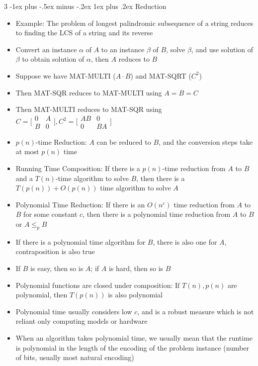 \documentclass[10pt, landscape]{article}
\makeatletter
\renewcommand{\subsection}{\@startsection{subsection}{3}{0mm}%
                                {-1ex plus -.5ex minus -.2ex}%
                                {1ex plus .2ex}%
                                {\normalfont\small\bfseries}}%
\makeatother
\begin{document}
\begin{multicols*}{3}
\subsection{Reduction}
\begin{itemize}
    \item Example: The problem of longest palindromic subsequence of a string reduces to finding the LCS of a string and its reverse
    \item Convert an instance $\alpha$ of $A$ to an instance $\beta$ of $B$, solve $\beta$, and use solution of $\beta$ to obtain solution of $\alpha$, then $A$ reduces to $B$
    \item Suppose we have MAT-MULTI ($A \cdot B$) and MAT-SQRT ($C^2$)
    \item Then MAT-SQR reduces to MAT-MULTI using $A=B=C$
    \item Then MAT-MULTI reduces to MAT-SQR using $C=\big[\begin{smallmatrix}0 & A\\B & 0\end{smallmatrix}\big], C^2=\big[\begin{smallmatrix}AB & 0\\0 & BA\end{smallmatrix}\big]$
    \item $p(n)$-time Reduction: $A$ can be reduced to $B$, and the conversion steps take at most $p(n)$ time
    \item Running Time Composition: If there is a $p(n)$-time reduction from $A$ to $B$ and a $T(n)$-time algorithm to solve $B$, then there is a $T(p(n))+O(p(n))$ time algorithm to solve $A$
    \item Polynomial Time Reduction: If there is an $O(n^c)$ time reduction from $A$ to $B$ for some constant $c$, then there is a polynomial time reduction from $A$ to $B$ or $A \leq_p B$
    \item If there is a polynomial time algorithm for $B$, there is also one for $A$, contraposition is also true
    \item If $B$ is easy, then so is $A$; if $A$ is hard, then so is $B$
    \item Polynomial functions are closed under composition: If $T(n), p(n)$ are polynomial, then $T(p(n))$ is also polynomial
    \item Polynomial time usually considers low $c$, and is a robust measure which is not reliant only computing models or hardware
    \item When an algorithm takes polynomial time, we usually mean that the runtime is polynomial in the length of the encoding of the problem instance (number of bits, usually most natural encoding)

\end{itemize}
\end{multicols*}
\end{document}
